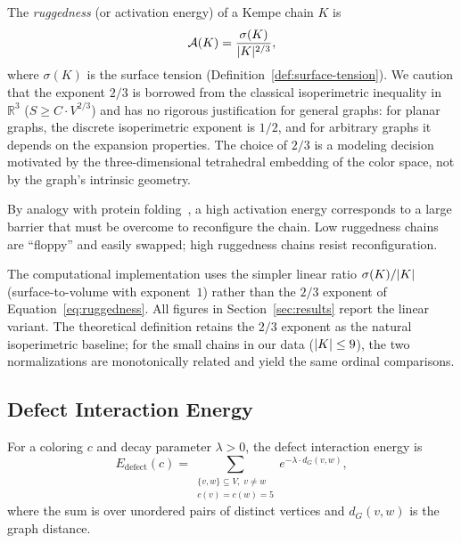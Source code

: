 \begin{definition}\label{def:ruggedness}
The \emph{ruggedness} (or activation energy) of a Kempe chain $K$ is
\begin{equation}\label{eq:ruggedness}
  \mathcal{A}(K) = \frac{\sigma(K)}{\lvert K \rvert^{2/3}},
\end{equation}
where $\sigma(K)$ is the surface tension
(Definition~\ref{def:surface-tension}). We caution that the exponent
$2/3$ is borrowed from the classical isoperimetric inequality in
$\mathbb{R}^3$ ($S \geq C \cdot V^{2/3}$) and has no rigorous
justification for general graphs: for planar graphs, the discrete
isoperimetric exponent is $1/2$, and for arbitrary graphs it depends
on the expansion properties. The choice of $2/3$ is a modeling
decision motivated by the three-dimensional tetrahedral embedding
of the color space, not by the graph's intrinsic geometry.
\end{definition}

By analogy with protein folding~\cite{levinthal1969}, a high activation
energy corresponds to a large barrier that must be overcome to
reconfigure the chain. Low ruggedness chains are ``floppy'' and easily
swapped; high ruggedness chains resist reconfiguration.

\begin{remark}\label{rem:ruggedness-impl}
The computational implementation uses the simpler linear ratio
$\sigma(K)/\lvert K \rvert$ (surface-to-volume with exponent~$1$) rather than
the $2/3$ exponent of Equation~\eqref{eq:ruggedness}. All figures in
Section~\ref{sec:results} report the linear variant. The theoretical
definition retains the $2/3$ exponent as the natural isoperimetric
baseline; for the small chains in our data ($\lvert K \rvert \leq 9$), the two
normalizations are monotonically related and yield the same ordinal
comparisons.
\end{remark}

\subsection{Defect Interaction Energy}\label{sec:defect-energy}

\begin{definition}\label{def:defect-interaction}
For a coloring $c$ and decay parameter $\lambda > 0$, the defect
interaction energy is
\begin{equation}\label{eq:defect-interaction}
  E_{\text{defect}}(c) =
  \sum_{\substack{\{v, w\} \subseteq V,\; v \neq w \\ c(v) = c(w) = 5}}
  e^{-\lambda \cdot d_G(v, w)},
\end{equation}
where the sum is over unordered pairs of distinct vertices and
$d_G(v, w)$ is the graph distance.
\end{definition}

